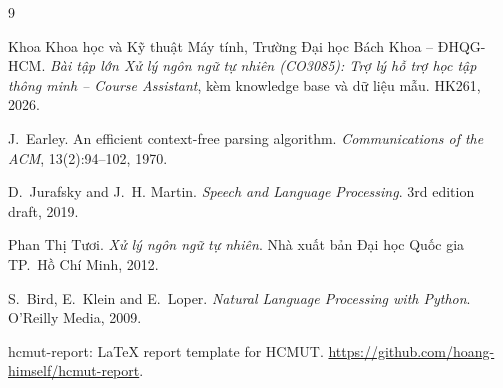 \begin{thebibliography}{9}

  Khoa Khoa học và Kỹ thuật Máy tính, Trường Đại học Bách Khoa -- ĐHQG-HCM.
  \emph{Bài tập lớn Xử lý ngôn ngữ tự nhiên (CO3085): Trợ lý hỗ trợ học tập thông
  minh -- Course Assistant}, kèm knowledge base và dữ liệu mẫu. HK261, 2026.

  J.~Earley. An efficient context-free parsing algorithm.
  \emph{Communications of the ACM}, 13(2):94--102, 1970.

  D.~Jurafsky and J.~H. Martin. \emph{Speech and Language Processing}. 3rd edition
  draft, 2019.

  Phan Thị Tươi. \emph{Xử lý ngôn ngữ tự nhiên}. Nhà xuất bản Đại học Quốc gia
  TP.~Hồ Chí Minh, 2012.

  S.~Bird, E.~Klein and E.~Loper. \emph{Natural Language Processing with Python}.
  O'Reilly Media, 2009.

  hcmut-report: \LaTeX{} report template for HCMUT.
  \url{https://github.com/hoang-himself/hcmut-report}.
\end{thebibliography}

